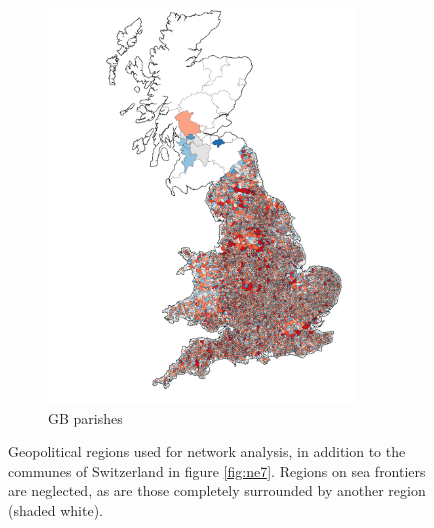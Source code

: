 \begin{figure}[tbp]
\begin{subfigure}[b]{0.48\textwidth}
         \includegraphics[width=0.9\textwidth]{./appendices/figures/gbp_lowres.pdf}
         \caption{GB parishes}
         \label{appfig:mapd}
     \end{subfigure}

	\caption{Geopolitical regions used for network analysis, in addition to the communes of Switzerland in figure \ref{fig:ne7}. Regions on sea frontiers are neglected, as are those completely surrounded by another region (shaded white).}
	\label{appfig:maps}
\end{figure}